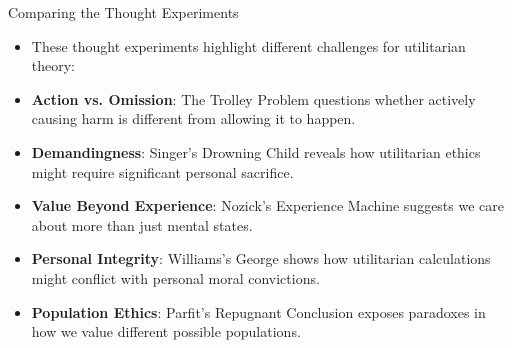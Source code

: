 \documentclass[aspectratio=169]{beamer}
\begin{document}
\begin{frame}{Comparing the Thought Experiments}
    \begin{itemize}
        
        \item These thought experiments highlight different challenges for utilitarian theory:
        
        \item \textbf{Action vs. Omission}: The Trolley Problem questions whether actively causing harm is different from allowing it to happen.
        
        \item \textbf{Demandingness}: Singer's Drowning Child reveals how utilitarian ethics might require significant personal sacrifice.
        
        \item \textbf{Value Beyond Experience}: Nozick's Experience Machine suggests we care about more than just mental states.
        
        \item \textbf{Personal Integrity}: Williams's George shows how utilitarian calculations might conflict with personal moral convictions.
        
        \item \textbf{Population Ethics}: Parfit's Repugnant Conclusion exposes paradoxes in how we value different possible populations.
    \end{itemize}
\end{frame}
\end{document}
